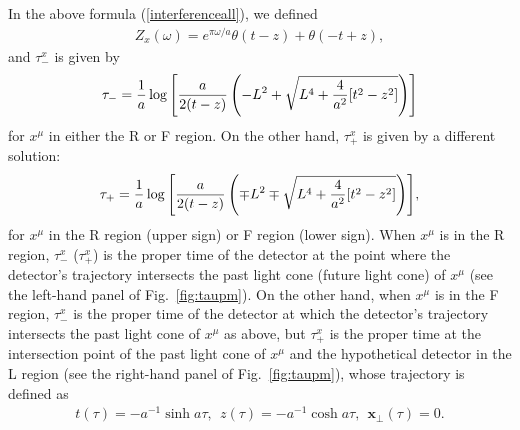 \documentclass[aps,prd,preprintnumbers,nofootinbib,showpacs,11pt]{revtex4}%
\begin{document}
\begin{widetext}
In the above formula (\ref{interferenceall}), we defined 
\begin{eqnarray}
Z_x(\omega)=e^{\pi\omega/a}\theta(t-z)+\theta(-t+z),
\label{defZx}
\end{eqnarray}
and $\tau_-^x$ is given by 
\begin{eqnarray}
\tau_-={{1\over a}\log\left[{a\over 2(t-z)}\left(-L^2+\sqrt{L^4+{4\over a^2}[t^2-z^2]}
\right)\right]}
\label{deftaum}
\end{eqnarray}
for $x^\mu$ in either the R or F region. 
On the other hand, $\tau_+^x$ is given by a different solution:
\begin{eqnarray}
\tau_+=
{{1\over a}\log\left[{a\over 2(t-z)}\left(\mp L^2 \mp \sqrt{L^4+{4\over a^2}[t^2-z^2]}
\right)\right]}, 
\label{deftaup}
\end{eqnarray}
for $x^\mu$ in the R region (upper sign) or F region (lower sign). 
When $x^\mu$ is in the R region, $\tau_-^x$ ($\tau_+^x$) is the proper time of the 
detector at the point where the detector's trajectory intersects the 
past light cone (future light cone) of $x^\mu$ (see the left-hand panel of Fig.~\ref{fig:taupm}). 
On the other hand, when $x^\mu$ is in the F region, $\tau_-^x$ is 
the proper time of the detector at which the detector's trajectory intersects 
the past light cone of $x^\mu$ as above, but
$\tau_+^x$ is 
the proper time at the intersection point of the past light cone
of $x^\mu$ and the
hypothetical detector in the L region (see the right-hand panel of Fig.~\ref{fig:taupm}),
whose trajectory is defined as 
\begin{eqnarray}
t(\tau)=-a^{-1}\sinh a\tau, \  ~z(\tau)=-a^{-1}\cosh a\tau, \  ~\bm x_\perp(\tau)=0.
\label{trajecL}
\end{eqnarray}


\end{widetext}
\end{document}
